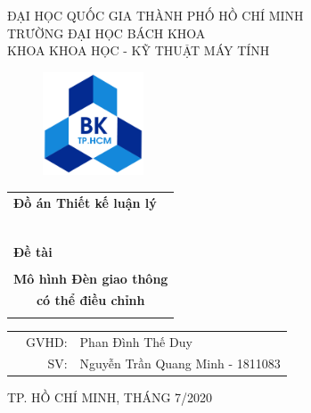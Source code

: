 \documentclass[a4paper]{article}
\begin{document}
\begin{titlepage}
\begin{center}
ĐẠI HỌC QUỐC GIA THÀNH PHỐ HỒ CHÍ MINH \\
TRƯỜNG ĐẠI HỌC BÁCH KHOA \\
KHOA KHOA HỌC - KỸ THUẬT MÁY TÍNH 
\end{center}

\vspace{1cm}

\begin{figure}[h!]
\begin{center}
\includegraphics[width=3cm]{hcmut.png}
\end{center}
\end{figure}

\vspace{1cm}


\begin{center}
\begin{tabular}{c}
\multicolumn{1}{l}{\textbf{{\Large Đồ án Thiết kế luận lý}}}\\
~~\\
\hline
\\
\multicolumn{1}{l}{\textbf{{\Large Đề tài}}}\\
\\
\textbf{{\Huge Mô hình Đèn giao thông}}\\
\textbf{{\Huge có thể điều chỉnh}}\\
\\
\hline
\end{tabular}
\end{center}

\vspace{3cm}

\begin{table}[h]
\begin{tabular}{rrl}
\hspace{5 cm} & GVHD: & Phan Đình Thế Duy\\
& SV: & Nguyễn Trần Quang Minh - 1811083 \\
\end{tabular}
\end{table}

\begin{center}
{\footnotesize TP. HỒ CHÍ MINH, THÁNG 7/2020}
\end{center}
\end{titlepage}
\end{document}
